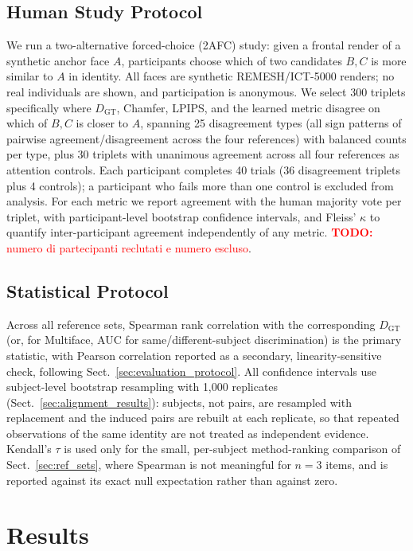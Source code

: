 \documentclass[10pt,twocolumn,letterpaper]{article}
\newcommand{\todo}[1]{\textcolor{red}{\textbf{TODO:} #1}}
\begin{document}
\subsection{Human Study Protocol}
\label{sec:human_study}
We run a two-alternative forced-choice (2AFC) study: given a frontal render of a synthetic anchor face $A$, participants choose which of two candidates $B,C$ is more similar to $A$ in identity. All faces are synthetic REMESH/ICT-5000 renders; no real individuals are shown, and participation is anonymous. We select 300 triplets specifically where $D_{\mathrm{GT}}$, Chamfer, LPIPS, and the learned metric disagree on which of $B,C$ is closer to $A$, spanning 25 disagreement types (all sign patterns of pairwise agreement/disagreement across the four references) with balanced counts per type, plus 30 triplets with unanimous agreement across all four references as attention controls. Each participant completes 40 trials (36 disagreement triplets plus 4 controls); a participant who fails more than one control is excluded from analysis. For each metric we report agreement with the human majority vote per triplet, with participant-level bootstrap confidence intervals, and Fleiss' $\kappa$ to quantify inter-participant agreement independently of any metric. \todo{numero di partecipanti reclutati e numero escluso}.

\subsection{Statistical Protocol}
\label{sec:statistics}
Across all reference sets, Spearman rank correlation with the corresponding $D_{\mathrm{GT}}$ (or, for Multiface, AUC for same/different-subject discrimination) is the primary statistic, with Pearson correlation reported as a secondary, linearity-sensitive check, following Sect.~\ref{sec:evaluation_protocol}. All confidence intervals use subject-level bootstrap resampling with 1,000 replicates (Sect.~\ref{sec:alignment_results}): subjects, not pairs, are resampled with replacement and the induced pairs are rebuilt at each replicate, so that repeated observations of the same identity are not treated as independent evidence. Kendall's $\tau$ is used only for the small, per-subject method-ranking comparison of Sect.~\ref{sec:ref_sets}, where Spearman is not meaningful for $n=3$ items, and is reported against its exact null expectation rather than against zero.

\section{Results}
\label{sec:results}
\end{document}
